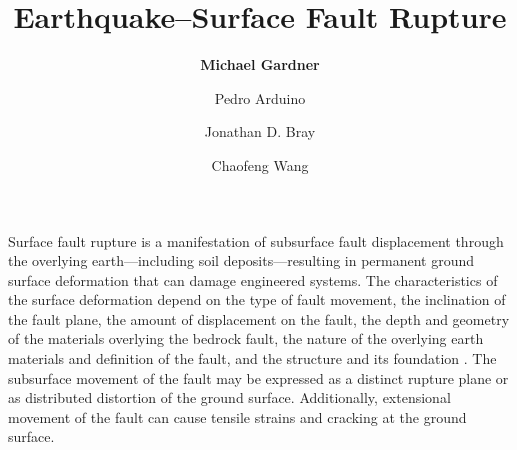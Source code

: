 %
%
%


%
%
%
%
%
%
%
%

\title{Earthquake--Surface Fault Rupture}
\author{
    \textbf{Michael Gardner } 
    \and Pedro Arduino
    \and Jonathan D. Bray
    \and Chaofeng Wang}
\tocauthor{}
%
%
\maketitle

Surface fault rupture is a manifestation of subsurface fault displacement through the overlying earth---including soil deposits---resulting in permanent ground surface deformation that can damage engineered systems. The characteristics of the surface deformation depend on the type of fault movement, the inclination of the fault plane, the amount of displacement on the fault, the depth and geometry of the materials overlying the bedrock fault, the nature of the overlying earth materials and definition of the fault, and the structure and its foundation \citep{bray2001developing}. The subsurface movement of the fault may be expressed as a distinct rupture plane or as distributed distortion of the ground surface. Additionally, extensional movement of the fault can cause tensile strains and cracking at the ground surface.

